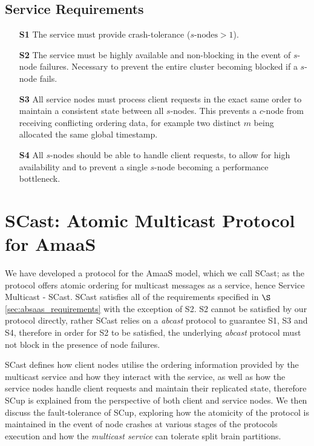     \subsection*{Service Requirements}
	\begin{itemize}
		\item [\textbf{S1}] The service must provide crash-tolerance ($s\text{-nodes} > 1$).
		
		\item [\textbf{S2}] The service must be highly available and non-blocking in the event of $s$-node failures.  Necessary to prevent the entire cluster becoming blocked if a $s$-node fails.   
		
		\item [\textbf{S3}] All service nodes must process client requests in the exact same order to maintain a consistent state between all $s$-nodes.  This prevents a $c$-node from receiving conflicting ordering data, for example two distinct $m$ being allocated the same global timestamp.  
		
		\item [\textbf{S4}] All $s$-nodes should be able to handle client requests, to allow for high availability and to prevent a single $s$-node becoming a performance bottleneck.
	\end{itemize}

\section{SCast: Atomic Multicast Protocol for AmaaS}\label{sec:scast_protocol}
We have developed a protocol for the \textsf{AmaaS} model, which we call \textsf{SCast}; as the protocol offers atomic ordering for multicast messages as a service, hence Service Multicast - \textsf{SCast}.  \textsf{SCast} satisfies all of the requirements specified in $\S$ \ref{sec:absaas_requirements} with the exception of S2.  S2 cannot be satisfied by our protocol directly, rather \textsf{SCast} relies on a \emph{abcast} protocol to guarantee S1, S3 and S4, therefore in order for S2 to be satisfied, the underlying \emph{abcast} protocol must not block in the presence of node failures.  

\textsf{SCast} defines how client nodes utilise the ordering information provided by the multicast service and how they interact with the service, as well as how the service nodes handle client requests and maintain their replicated state, therefore \textsf{SCup} is explained from the perspective of both client and service nodes.  We then discuss the fault-tolerance of \textsf{SCup}, exploring how the atomicity of the protocol is maintained in the event of node crashes at various stages of the protocols execution and how the \emph{multicast service} can tolerate split brain partitions.  

